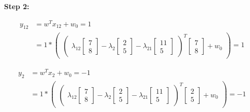\documentclass[12pt]{report}
\begin{document}
\vspace{20pt}

\textbf{Step 2:}

\begin{equation*}
	\begin{aligned}
		y_{12} & =  w^T x_{12} + w_{0} = 1               \\
		       & = 1 * \begin{pmatrix}
			               \begin{pmatrix}
				\lambda_{12}\begin{bmatrix}
					            7 \\
					            8
				            \end{bmatrix} -

				\lambda_{2}\begin{bmatrix}
					           2 \\
					           5
				           \end{bmatrix} -

				\lambda_{21}\begin{bmatrix}
					            11 \\
					            5
				            \end{bmatrix}
			\end{pmatrix}   ^ T
			               \begin{bmatrix}
				7 \\
				8
			\end{bmatrix} + w_{0}
		               \end{pmatrix} = 1
	\end{aligned}
\end{equation*}

\begin{equation*}
	\begin{aligned}
		y_{2} & =  w^T x_{2} + w_{0} = -1               \\
		      & = 1 * \begin{pmatrix}
			              \begin{pmatrix}
				\lambda_{12}\begin{bmatrix}
					            7 \\
					            8
				            \end{bmatrix} -

				\lambda_{2}\begin{bmatrix}
					           2 \\
					           5
				           \end{bmatrix} -

				\lambda_{21}\begin{bmatrix}
					            11 \\
					            5
				            \end{bmatrix}
			\end{pmatrix}  ^ T
			              \begin{bmatrix}
				2 \\
				5
			\end{bmatrix} + w_{0}
		              \end{pmatrix} = -1
	\end{aligned}
\end{equation*}
\end{document}
